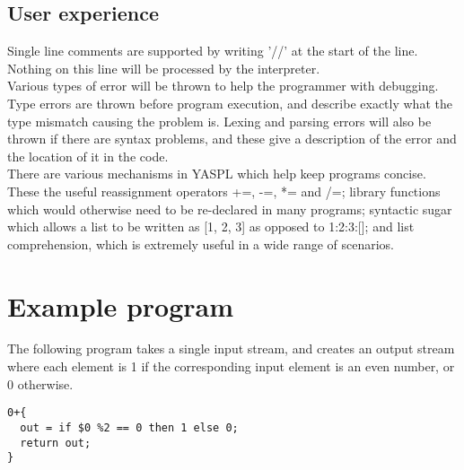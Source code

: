 \documentclass{article}
\begin{document}
\subsection{User experience}
Single line comments are supported by writing '//' at the start of the line. Nothing on this line will be processed by the interpreter.
\\
Various types of error will be thrown to help the programmer with debugging. Type errors are thrown before program execution, and describe exactly what the type mismatch causing the problem is. Lexing and parsing errors will also be thrown if there are syntax problems, and these give a description of the error and the location of it in the code.
\\
There are various mechanisms in YASPL which help keep programs concise. These the useful reassignment operators +=, -=, *= and /=; library functions which would otherwise need to be re-declared in many programs; syntactic sugar which allows a list to be written as [1, 2, 3] as opposed to 1:2:3:[]; and list comprehension, which is extremely useful in a wide range of scenarios. 
\\




\section{Example program}
The following program takes a single input stream, and creates an output stream where each element is 1 if the corresponding input element is an even number, or 0 otherwise.
\begin{lstlisting}
0+{
  out = if $0 %2 == 0 then 1 else 0;
  return out;
}
\end{lstlisting}
\end{document}

